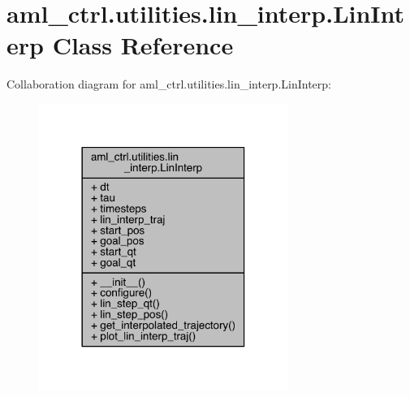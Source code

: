 \hypertarget{classaml__ctrl_1_1utilities_1_1lin__interp_1_1_lin_interp}{}\section{aml\+\_\+ctrl.\+utilities.\+lin\+\_\+interp.\+Lin\+Interp Class Reference}
\label{classaml__ctrl_1_1utilities_1_1lin__interp_1_1_lin_interp}


Collaboration diagram for aml\+\_\+ctrl.\+utilities.\+lin\+\_\+interp.\+Lin\+Interp\+:\nopagebreak
\begin{figure}[H]
\begin{center}
\leavevmode
\includegraphics[width=230pt]{classaml__ctrl_1_1utilities_1_1lin__interp_1_1_lin_interp__coll__graph}
\end{center}
\end{figure}
